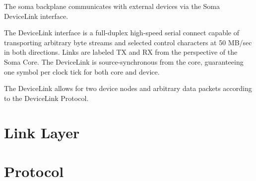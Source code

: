 
The soma backplane communicates with external devices via the Soma
DeviceLink interface.

The DeviceLink interface is a full-duplex high-speed serial connect
capable of transporting arbitrary byte streams and selected control
characters at 50 MB/sec in both directions. Links are labeled TX and
RX from the perspective of the Soma Core. The DeviceLink is
source-synchronous from the core, guaranteeing one symbol per clock
tick for both core and device.

The DeviceLink allows for two device nodes and arbitrary data packets
according to the DeviceLink Protocol.

\section {Link Layer}



\section {Protocol}



